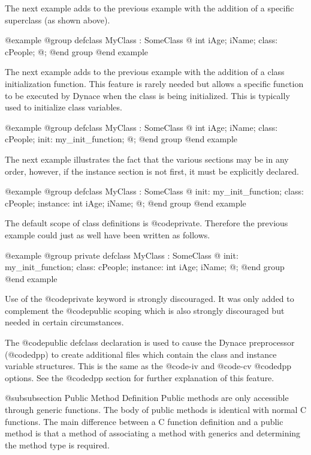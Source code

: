 The next example adds to the previous example with the addition of
a specific superclass (as shown above).

@example
@group
defclass   MyClass  :  SomeClass  @{
        int     iAge;
        iName;
 class:
        cPeople;
@};
@end group
@end example


The next example adds to the previous example with the addition of
a class initialization function.  This feature is rarely needed but allows
a specific function to be executed by Dynace when the class is being
initialized.  This is typically used to initialize class variables.

@example
@group
defclass   MyClass  :  SomeClass  @{
        int     iAge;
        iName;
 class:
        cPeople;
 init:  my_init_function;
@};
@end group
@end example


The next example illustrates the fact that the various sections
may be in any order, however, if the instance section is not first, it
must be explicitly declared.

@example
@group
defclass   MyClass  :  SomeClass  @{
 init:  my_init_function;
 class:
        cPeople;
 instance:
        int     iAge;
        iName;
@};
@end group
@end example

The default scope of class definitions is @code{private}.  Therefore
the previous example could just as well have been written as follows.

@example
@group
private  defclass   MyClass  :  SomeClass  @{
 init:  my_init_function;
 class:
        cPeople;
 instance:
        int     iAge;
        iName;
@};
@end group
@end example

Use of the @code{private} keyword is strongly discouraged.  It was only
added to complement the @code{public} scoping which is also strongly
discouraged but needed in certain circumstances.

The @code{public defclass} declaration is used to cause the Dynace
preprocessor (@code{dpp}) to create additional files which contain the
class and instance variable structures.  This is the same as the
@code{-iv} and @code{-cv} @code{dpp} options.  See the @code{dpp}
section for further explanation of this feature.



@subsubsection Public Method Definition
Public methods are only accessible through generic functions.
The body of public methods is identical with normal C functions.
The main difference between a C function definition and a public
method is that a method of associating a method with generics
and determining the method type is required.

